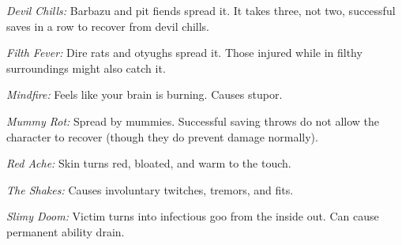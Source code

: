 \documentclass{article}
\begin{document}
\textit{Devil Chills: }Barbazu and pit fiends spread it. It takes three, not two, 
successful saves in a row to recover from devil chills.

\textit{Filth Fever: }Dire rats and otyughs spread it. Those injured while in filthy 
surroundings might also catch it.

\textit{Mindfire: }Feels like your brain is burning. Causes stupor.

\textit{Mummy Rot: }Spread by mummies. Successful saving throws do not allow the 
character to recover (though they do prevent damage normally).

\textit{Red Ache: }Skin turns red, bloated, and warm to the touch.

\textit{The Shakes: }Causes involuntary twitches, tremors, and fits.

\textit{Slimy Doom: }Victim turns into infectious goo from the inside out. Can 
cause permanent ability drain.
\end{document}
